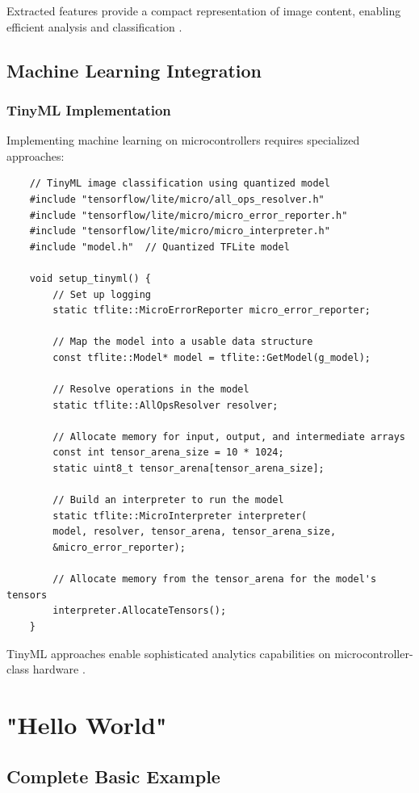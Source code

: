 Extracted features provide a compact representation of image content, enabling efficient analysis and classification \cite{Hagemann:2021}.

\subsection{Machine Learning Integration}
\subsubsection{TinyML Implementation}
Implementing machine learning on microcontrollers requires specialized approaches:

\begin{verbatim}
	// TinyML image classification using quantized model
	#include "tensorflow/lite/micro/all_ops_resolver.h"
	#include "tensorflow/lite/micro/micro_error_reporter.h"
	#include "tensorflow/lite/micro/micro_interpreter.h"
	#include "model.h"  // Quantized TFLite model
	
	void setup_tinyml() {
		// Set up logging
		static tflite::MicroErrorReporter micro_error_reporter;
		
		// Map the model into a usable data structure
		const tflite::Model* model = tflite::GetModel(g_model);
		
		// Resolve operations in the model
		static tflite::AllOpsResolver resolver;
		
		// Allocate memory for input, output, and intermediate arrays
		const int tensor_arena_size = 10 * 1024;
		static uint8_t tensor_arena[tensor_arena_size];
		
		// Build an interpreter to run the model
		static tflite::MicroInterpreter interpreter(
		model, resolver, tensor_arena, tensor_arena_size, 
		&micro_error_reporter);
		
		// Allocate memory from the tensor_arena for the model's tensors
		interpreter.AllocateTensors();
	}
\end{verbatim}

TinyML approaches enable sophisticated analytics capabilities on microcontroller-class hardware \cite{Arducam:2023}.

\section{"Hello World"}
\subsection{Complete Basic Example}
